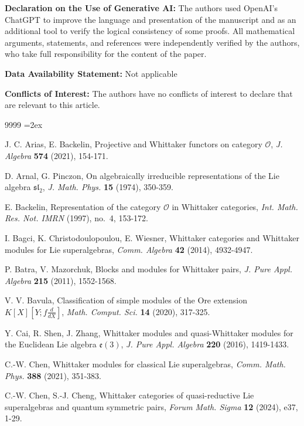 \documentclass[a4paper,10pt]{article}
\theoremstyle{definition}
\theoremstyle{plain}
\theoremstyle{remark}
\theoremstyle{mystyle}
\numberwithin{equation}{section}
\begin{document}
\textbf{Declaration on the Use of Generative AI:} The authors used OpenAI’s ChatGPT
to improve the language and presentation of the manuscript and as an additional tool to verify the logical consistency of some proofs. All mathematical arguments, statements, and references were independently verified by the authors, who take full responsibility for the content of the paper.
\bigskip

\textbf{Data Availability Statement:} Not applicable
\bigskip

\textbf{Conflicts of Interest:} The authors have no conflicts of interest to declare that are relevant to this article.

\begin{thebibliography}{9999}\vskip0pt\small
\parindent=2ex\parskip=-3.3pt\baselineskip=-3.3pt

 J. C. Arias, E. Backelin, Projective and Whittaker functors on category $\mathcal{O}$, {\it J. Algebra} {\bf 574} (2021), 154-171.

 D. Arnal, G. Pinczon, On algebraically irreducible representations of the Lie algebra $\mathfrak{sl}_2$, {\it J. Math. Phys.} {\bf15} (1974), 350-359.

 E. Backelin, Representation of the category $\mathcal O$ in Whittaker categories, {\it Int. Math. Res. Not. IMRN} (1997), no.~4, 153-172.

 I. Bagci, K. Christodoulopoulou, E. Wiesner, Whittaker categories and Whittaker modules for Lie superalgebras, {\it Comm. Algebra} {\bf 42} (2014), 4932-4947.

 P. Batra, V. Mazorchuk, Blocks and modules for Whittaker pairs, {\it J. Pure Appl. Algebra} {\bf 215} (2011), 1552-1568.

 V. V. Bavula, Classification of simple modules of the Ore extension
$K[X][Y; f\frac{d}{dX}]$, {\it Math. Comput. Sci.} {\bf 14} (2020), 317-325.

 Y. Cai, R. Shen, J. Zhang, Whittaker modules and quasi-Whittaker modules for the Euclidean Lie algebra $\mathfrak e(3)$, {\it J. Pure Appl. Algebra} {\bf 220} (2016), 1419-1433.

 C.-W. Chen, Whittaker modules for classical Lie superalgebras, {\it Comm. Math. Phys.} {\bf388} (2021), 351-383.

 C.-W. Chen, S.-J. Cheng, Whittaker categories of quasi-reductive Lie superalgebras and quantum
symmetric pairs, {\it Forum Math. Sigma} {\bf 12} (2024), e37, 1-29.


\end{thebibliography}
\end{document}
